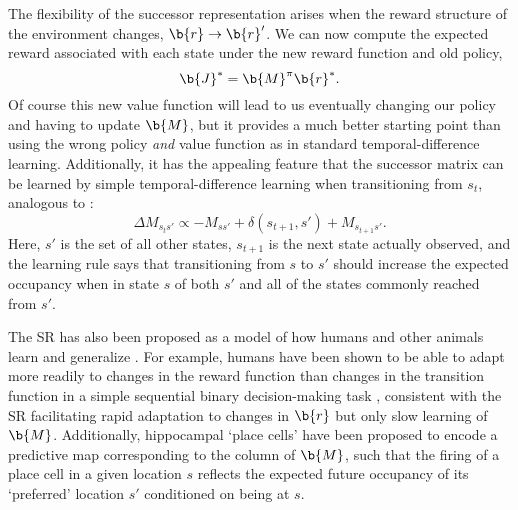 The flexibility of the successor representation arises when the reward structure of the environment changes, $\b{r} \rightarrow \b{r}'$.
We can now compute the expected reward associated with each state under the new reward function and old policy,
\begin{equation}
    \b{J}^* = \b{M}^\pi \b{r}^*.
\end{equation}
Of course this new value function will lead to us eventually changing our policy and having to update $\b{M}$, but it provides a much better starting point than using the wrong policy \emph{and} value function as in standard temporal-difference learning.
Additionally, it has the appealing feature that the successor matrix can be learned by simple temporal-difference learning when transitioning from $s_t$, analogous to :
\begin{equation}
    \Delta M_{s_t s'} \propto -M_{ss'} + \delta(s_{t+1}, s') + M_{s_{t+1} s'}.
\end{equation}
Here, ${s'}$ is the set of all other states, $s_{t+1}$ is the next state actually observed, and the learning rule says that transitioning from $s$ to $s'$ should increase the expected occupancy when in state $s$ of both $s'$ and all of the states commonly reached from $s'$.

The SR has also been proposed as a model of how humans and other animals learn and generalize \citep{momennejad2017successor, stachenfeld2017hippocampus, geerts2020general}.
For example, humans have been shown to be able to adapt more readily to changes in the reward function than changes in the transition function in a simple sequential binary decision-making task \citep{momennejad2017successor}, consistent with the SR facilitating rapid adaptation to changes in $\b{r}$ but only slow learning of $\b{M}$.
Additionally, hippocampal `place cells' have been proposed to encode a predictive map corresponding to the column of $\b{M}$, such that the firing of a place cell in a given location $s$ reflects the expected future occupancy of its `preferred' location $s'$ conditioned on being at $s$.

